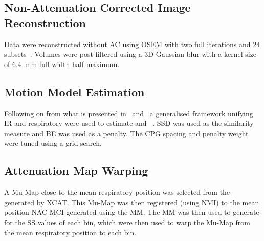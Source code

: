             \subsection{Non-Attenuation Corrected Image Reconstruction} \label{sec:pet_ct_respiratory_motion_correction_with_a_single_attenuation_map_using_nac_derived_deformation_fields_methods_non-attenuation_corrected_image_reconstruction}
                Data were reconstructed without \gls{AC} using \gls{OSEM} with two full iterations and $24$ subsets~\parencite{Hudson1994}.
                Volumes were post-filtered using a \gls{3D} Gaussian blur with a kernel size of \SI{6.4}{\milli\metre} full width half maximum.
            
            \subsection{Motion Model Estimation} \label{sec:pet_ct_respiratory_motion_correction_with_a_single_attenuation_map_using_nac_derived_deformation_fields_methods_motion_model_estimation}
                Following on from what is presented in~ and~ a generalised framework unifying \gls{IR} and respiratory  were used to estimate  and ~\parencite{McClelland2017}. \gls{SSD} was used as the similarity measure and \gls{BE} was used as a penalty. The \gls{CPG} spacing and penalty weight were tuned using a grid search.
            
            \subsection{Attenuation Map Warping} \label{sec:pet_ct_respiratory_motion_correction_with_a_single_attenuation_map_using_nac_derived_deformation_fields_methods_attenuation_map_warping}
                A \gls{Mu-Map} close to the mean respiratory position was selected from the  generated by \gls{XCAT}. This \gls{Mu-Map} was then registered (using \gls{NMI}) to the mean position \gls{NAC} \gls*{MCI} generated using the \gls{MM}. The \gls{MM} was then used to generate  for the \gls{SS} values of each bin, which were then used to warp the \gls{Mu-Map} from the mean respiratory position to each bin.
            
